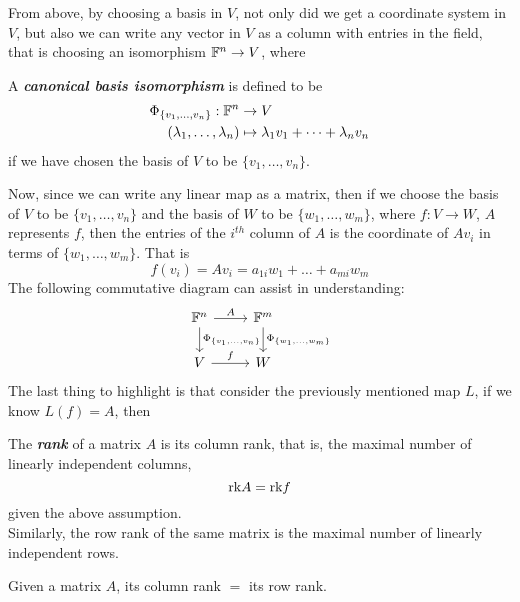 From above, by choosing a basis in $V$, not only did we get a coordinate system in $V$, but also we can write any vector in $V$ as a column with entries in the field, that is choosing an isomorphism $\mathbb{F}^n \to V$, where
\begin{definition}
    A \textbf{\textit{canonical basis isomorphism}} is defined to be
    \begin{align*}
        \Phi_{\{v_1,\dots, v_n\}}: \mathbb{F}^n & \to V \\
        (\lambda_1, \dots, \lambda_n) & \mapsto \lambda_1 v_1 + \dots + \lambda_n v_n
    \end{align*}
    if we have chosen the basis of $V$ to be $\{v_1,\dots, v_n\}$.
\end{definition}
Now, since we can write any linear map as a matrix, then if we choose the basis of $V$ to be $\{v_1,\dots, v_n\}$ and the basis of $W$ to be $\{w_1,\dots, w_m\}$, where $f: V \to W$, $A$ represents $f$, then the entries of the $i^{th}$ column of $A$ is the coordinate of $Av_i$ in terms of $\{w_1,\dots, w_m\}$. That is
$$f(v_i) = Av_i = a_{1i}w_1 + \dots + a_{mi}w_m$$
The following commutative diagram can assist in understanding:
$$\begin{tikzcd}
    \F^n \arrow[r, "A"] \arrow[d, "\Phi_{\{v_1,\dots, v_n\}}"]
        & \F^m \arrow[d, "\Phi_{\{w_1,\dots, w_m\}}"] \\
    V \arrow [r, "f"]
        & W
\end{tikzcd}$$
The last thing to highlight is that consider the previously mentioned map $L$, if we know $L(f) = A$, then
\begin{definition}
    The \textbf{\textit{rank}} of a matrix $A$ is its column rank, that is, the maximal number of linearly independent columns,
    $$\text{rk} A = \text{rk} f$$
    given the above assumption. \\
    Similarly, the row rank of the same matrix is the maximal number of linearly independent rows.
\end{definition}
\begin{theorem}
    Given a matrix $A$, its column rank $=$ its row rank.
\end{theorem}
\newpage